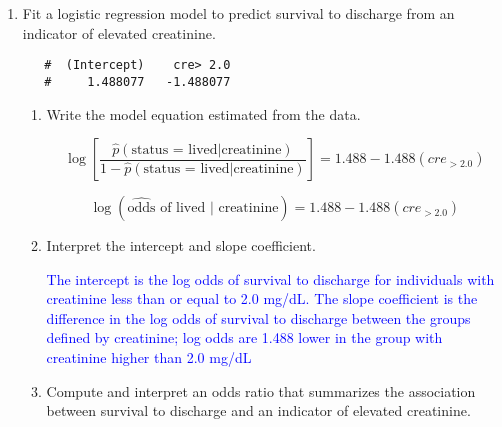 \documentclass[letterpaper,12pt,twoside,]{pinp}
\begin{document}
\begin{enumerate}
\def\labelenumi{\arabic{enumi}.}
\setcounter{enumi}{3}
\item
  Fit a logistic regression model to predict survival to discharge from
  an indicator of elevated creatinine.

\begin{Shaded}
\begin{Highlighting}[]
\SpecialCharTok{\textasciitilde{}} \NormalTok{(} \NormalTok{))}\SpecialCharTok{$}
\end{Highlighting}
\end{Shaded}

  \begin{ShadedResult}
   \begin{verbatim}
   #  (Intercept)    cre> 2.0 
   #     1.488077   -1.488077
   \end{verbatim}
   \end{ShadedResult}

  \begin{enumerate}
  \def\labelenumii{\alph{enumii})}
  \item
    Write the model equation estimated from the data.

    \color{blue}

    \[\log\left[\frac{\hat{p}( \text{status = lived} |\text{creatinine})}{1 - \hat{p}(\text{status = lived} | \text{creatinine})}\right] = 1.488 -1.488(cre_{> 2.0})\]

    \[\log (\widehat{\text{odds}}\text{ of lived | creatinine}) = 1.488 - 1.488(cre_{> 2.0}) \]

    \color{black}
  \item
    Interpret the intercept and slope coefficient.

    \textcolor{blue}{The intercept is the log odds of survival to discharge for individuals with creatinine less than or equal to 2.0 mg/dL. The slope coefficient is the difference in the log odds of survival to discharge between the groups defined by creatinine; log odds are 1.488 lower in the group with creatinine higher than 2.0 mg/dL}
  \item
    Compute and interpret an odds ratio that summarizes the association
    between survival to discharge and an indicator of elevated
    creatinine.


\end{enumerate}
\end{enumerate}
\end{document}
